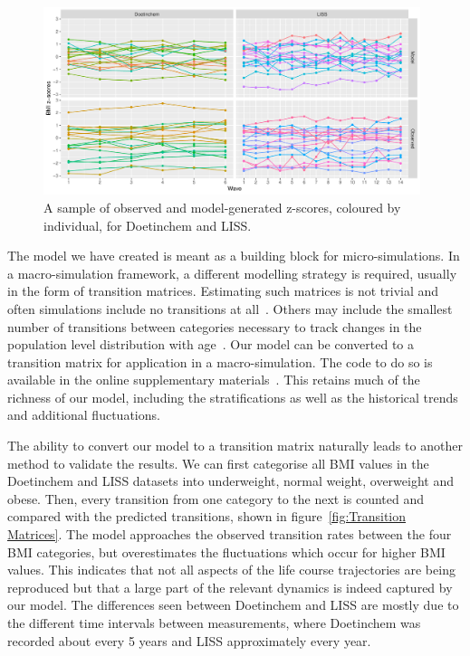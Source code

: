 \documentclass{imammb}
\numberwithin{equation}{section}
\begin{document}
\vspace{-4mm}

\begin{figure}[!h]
\centering\includegraphics[width=0.98\textwidth] {"Figures/Individual Z-Score Trajectories.pdf"}
\caption{A sample of observed and model-generated z-scores, coloured by individual, for Doetinchem and LISS.}
\label{fig:Individual Z-Score Trajectories}
\vspace*{-9pt}
\end{figure}

\vspace{1mm}

The model we have created is meant as a building block for micro-simulations. In a macro-simulation framework, a different modelling strategy is required, usually in the form of transition matrices. Estimating such matrices is not trivial and often simulations include no transitions at all~\citep{Hendriksen2015}. Others may include the smallest number of transitions between categories necessary to track changes in the population level distribution with age~\citep{VandeKassteele2012}. Our model can be converted to a transition matrix for application in a macro-simulation. The code to do so is available in the online supplementary materials~\citep{Bogaardt2023}. This retains much of the richness of our model, including the stratifications as well as the historical trends and additional fluctuations.

The ability to convert our model to a transition matrix naturally leads to another method to validate the results. We can first categorise all BMI values in the Doetinchem and LISS datasets into underweight, normal weight, overweight and obese. Then, every transition from one category to the next is counted and compared with the predicted transitions, shown in figure~\ref{fig:Transition Matrices}. The model approaches the observed transition rates between the four BMI categories, but overestimates the fluctuations which occur for higher BMI values. This indicates that not all aspects of the life course trajectories are being reproduced but that a large part of the relevant dynamics is indeed captured by our model. The differences seen between Doetinchem and LISS are mostly due to the different time intervals between measurements, where Doetinchem was recorded about every 5 years and LISS approximately every year.
\end{document}
